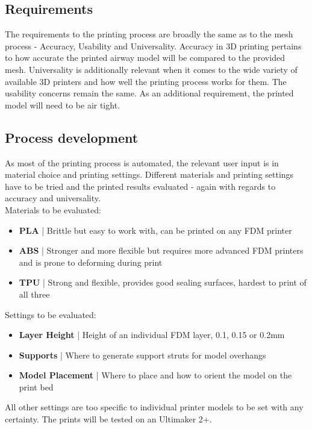 \documentclass[MME,Projekt,english]{twbook}%
\begin{document}
\subsection{Requirements}

The requirements to the printing process are broadly the same as to the mesh process - Accuracy, Usability and Universality.
Accuracy in 3D printing pertains to how accurate the printed airway model will be compared to the provided mesh.
Universality is additionally relevant when it comes to the wide variety of available 3D printers and how well the printing process
works for them. The usability concerns remain the same. As an additional requirement, the printed model
will need to be air tight.

\subsection{Process development}

As most of the printing process is automated, the relevant user input is in material choice and printing settings.
Different materials and printing settings have to be tried and the printed results evaluated - again with regards to accuracy and universality.\\

Materials to be evaluated:
\begin{itemize}
	\item \textbf{PLA} | Brittle but easy to work with, can be printed on any FDM printer
	\item \textbf{ABS} | Stronger and more flexible but requires more advanced FDM printers and is prone to deforming during print
	\item \textbf{TPU} | Strong and flexible, provides good sealing surfaces, hardest to print of all three
\end{itemize}

Settings to be evaluated:
\begin{itemize}
	\item \textbf{Layer Height} | Height of an individual FDM layer, 0.1, 0.15 or 0.2mm
	\item \textbf{Supports} | Where to generate support struts for model overhangs
	\item \textbf{Model Placement} | Where to place and how to orient the model on the print bed
\end{itemize}
All other settings are too specific to individual printer models to be set with any certainty. The prints
will be tested on an Ultimaker 2+.
\end{document}
